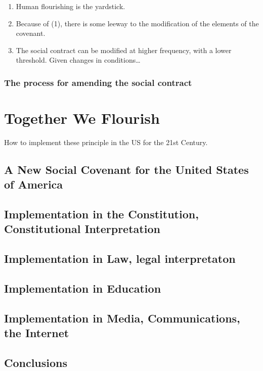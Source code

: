 \documentclass[
]{book}
\providecommand{\tightlist}{%
  \setlength{\itemsep}{0pt}\setlength{\parskip}{0pt}}
\begin{document}
\begin{enumerate}
\def\labelenumi{\arabic{enumi}.}
\tightlist
\item
  Human flourishing is the yardstick.
\item
  Because of (1), there is some leeway to the modification of the
  elements of the covenant.
\item
  The social contract can be modified at higher frequency, with a
  lower threshold. Given changes in conditions\ldots{}
\end{enumerate}

\hypertarget{the-process-for-amending-the-social-contract}{%
\section{The process for amending the social contract}\label{the-process-for-amending-the-social-contract}}

\hypertarget{part-together-we-flourish}{%
\part{Together We Flourish}\label{part-together-we-flourish}}

How to implement these principle in the US for the 21st Century.

\hypertarget{a-new-social-covenant-for-the-united-states-of-america}{%
\chapter{A New Social Covenant for the United States of America}\label{a-new-social-covenant-for-the-united-states-of-america}}

\hypertarget{implementation-in-the-constitution-constitutional-interpretation}{%
\chapter{Implementation in the Constitution, Constitutional Interpretation}\label{implementation-in-the-constitution-constitutional-interpretation}}

\hypertarget{implementation-in-law-legal-interpretaton}{%
\chapter{Implementation in Law, legal interpretaton}\label{implementation-in-law-legal-interpretaton}}

\hypertarget{implementation-in-education}{%
\chapter{Implementation in Education}\label{implementation-in-education}}

\hypertarget{implementation-in-media-communications-the-internet}{%
\chapter{Implementation in Media, Communications, the Internet}\label{implementation-in-media-communications-the-internet}}

\hypertarget{conclusions}{%
\chapter{Conclusions}\label{conclusions}}
\end{document}
